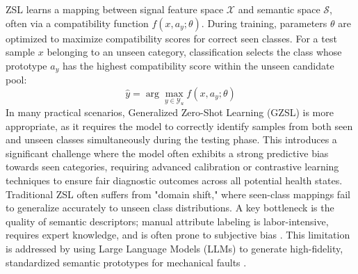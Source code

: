 ZSL learns a mapping between signal feature space $\mathcal{X}$ and semantic space $\mathcal{S}$, often via a compatibility function $f(x, a_y; \theta)$. During training, parameters $\theta$ are optimized to maximize compatibility scores for correct seen classes. For a test sample $x$ belonging to an unseen category, classification selects the class whose prototype $a_y$ has the highest compatibility score within the unseen candidate pool:
\begin{equation}
\hat{y} = \arg\max_{y \in \mathcal{Y}_u} f(x, a_y; \theta)
\end{equation}
In many practical scenarios, Generalized Zero-Shot Learning (GZSL) is more appropriate, as it requires the model to correctly identify samples from both seen and unseen classes simultaneously during the testing phase. This introduces a significant challenge where the model often exhibits a strong predictive bias towards seen categories, requiring advanced calibration or contrastive learning techniques to ensure fair diagnostic outcomes across all potential health states. Traditional ZSL often suffers from "domain shift," where seen-class mappings fail to generalize accurately to unseen class distributions. A key bottleneck is the quality of semantic descriptors; manual attribute labeling is labor-intensive, requires expert knowledge, and is often prone to subjective bias \cite{palatucci2009zero, lampert2009learning}. This limitation is addressed by using Large Language Models (LLMs) to generate high-fidelity, standardized semantic prototypes for mechanical faults \cite{xian2018zero}.

